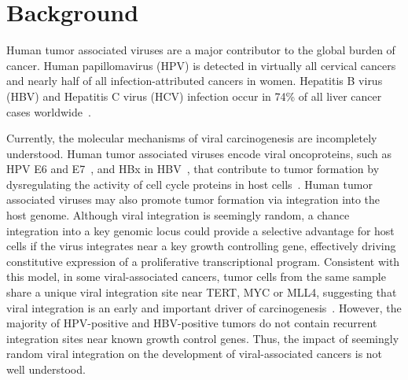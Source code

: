 \documentclass{bmcart}
\begin{document}

\section*{Background}
Human tumor associated viruses are a major contributor to the global burden of cancer. Human papillomavirus (HPV) is detected in virtually all cervical cancers and nearly half of all infection-attributed cancers in women. Hepatitis B virus (HBV) and Hepatitis C virus (HCV) infection occur in 74\% of all liver cancer cases worldwide~\cite{Plummer2016}.  

Currently, the molecular mechanisms of viral carcinogenesis are incompletely understood. 
Human tumor associated viruses encode viral oncoproteins, such as HPV E6 and E7~\cite{Duensing2002,Yim2005}, and HBx in HBV~\cite{Zhang2012}, that contribute to tumor formation by dysregulating the activity of cell cycle proteins in host cells~\cite{Carrillo-InfanteCAbbadessa2007,Moore2010,Mesri2014}. Human tumor associated viruses may also promote tumor formation via integration into the host genome. Although viral integration is seemingly random, a chance integration into a key genomic locus could provide a selective advantage for host cells if the virus integrates near a key growth controlling gene, effectively driving constitutive expression of a proliferative transcriptional program. Consistent with this model, in some viral-associated cancers, tumor cells from the same sample share a unique viral integration site near TERT, MYC or MLL4, suggesting that viral integration is an early and important driver of carcinogenesis~\cite{Moore2010}. However, the majority of HPV-positive and HBV-positive tumors do not contain recurrent integration sites near known growth control genes.  Thus, the impact of seemingly random viral integration on the development of viral-associated cancers is not well understood. 
\end{document}
